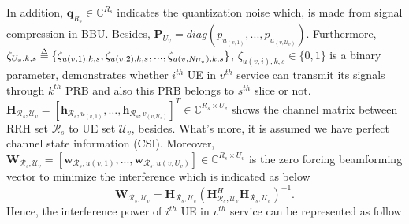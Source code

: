 \documentclass[conference]{IEEEtran}
\def\delequal{\mathrel{\ensurestackMath{\stackon[1pt]{=}{\scriptstyle\Delta}}}}
\begin{document}
In addition, $\boldsymbol{q}_{R_s} \in \mathbb{C}^{{R}_s }  $ indicates the quantization noise which, is made from signal compression in BBU.
Besides, $\boldsymbol{P}_{U_v} = diag(p_{u_{(v,1)}}, ..., p_{u_{(v,\mathcal{U}_v)}})$.
\newline
Furthermore, $\zeta_{U_v,k,s} \delequal \{\zeta_{u(v,1),k,s},\zeta_{u(v,2),k,s},...,\zeta_{u(v,N_{U_v}),k,s}\}$,
$\zeta_{u(v,i),k,s} \in \{0,1\}$ is a binary parameter, demonstrates whether $i^{th}$ UE in $v^{th}$ service can transmit its signals through $k^{th}$ PRB and also this PRB belongs to $s^{th}$ slice or not.
$\boldsymbol{H}_{\mathcal{R}_s,\mathcal{U}_v}=\left[\boldsymbol{h}_{\mathcal{R}_s,u_{(v,1)}},\ldots,\boldsymbol{h}_{\mathcal{R}_s,v_{(v,\mathcal{U}_v)}}\right]^T  \in \mathbb{C}^{{R}_s\times {U}_v }$ 
shows the channel matrix between RRH set $\mathcal{R}_s$ to UE set
$\mathcal{U}_v$, besides. 
What's more, it is assumed we have perfect channel state information (CSI).\newline
Moreover, $\boldsymbol{W}_{\mathcal{R}_s,\mathcal{U}_v} = [\boldsymbol{w}_{\mathcal{R}_s,u(v,1)},...,\boldsymbol{w}_{\mathcal{R}_s,u(v,U_v)}] \in \mathbb{C}^{{R}_s\times U_v} $ is the zero forcing beamforming vector to minimize the interference which is indicated as below
\begin{equation}
\boldsymbol{W}_{\mathcal{R}_s,\mathcal{U}_v} = \boldsymbol{H}_{\mathcal{R}_s,\mathcal{U}_v}(\boldsymbol{H}_{\mathcal{R}_s,\mathcal{U}_v}^H \boldsymbol{H}_{\mathcal{R}_s,\mathcal{U}_v})^{-1}.
\end{equation}
Hence, the interference power of $i^{th}$ UE in $v^{th}$ service can be represented as follow
\end{document}

